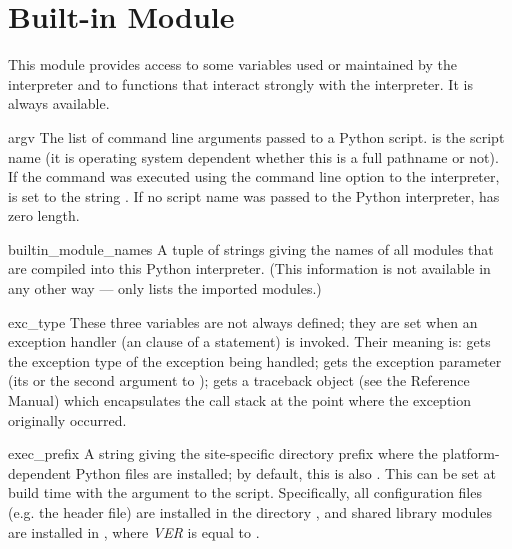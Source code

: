 \section{Built-in Module }

This module provides access to some variables used or maintained by the
interpreter and to functions that interact strongly with the interpreter.
It is always available.

\renewcommand{\indexsubitem}{(in module sys)}

\begin{datadesc}{argv}
  The list of command line arguments passed to a Python script.
   is the script name (it is operating system
  dependent whether this is a full pathname or not).
  If the command was executed using the  command line option
  to the interpreter,  is set to the string
  .
  If no script name was passed to the Python interpreter,
   has zero length.
\end{datadesc}

\begin{datadesc}{builtin_module_names}
  A tuple of strings giving the names of all modules that are compiled
  into this Python interpreter.  (This information is not available in
  any other way ---  only lists the imported
  modules.)
\end{datadesc}

\begin{datadesc}{exc_type}
  These three variables are not always defined; they are set when an
  exception handler (an  clause of a  statement) is
  invoked.  Their meaning is:  gets the exception type of
  the exception being handled;  gets the exception
  parameter (its  or the second argument to
  );  gets a traceback object (see the
  Reference Manual) which
  encapsulates the call stack at the point where the exception
  originally occurred.
\end{datadesc}

\begin{datadesc}{exec_prefix}
A string giving the site-specific
directory prefix where the platform-dependent Python files are
installed; by default, this is also .  This can be
set at build time with the  argument to the
 script.  Specifically, all configuration files
(e.g. the  header file) are installed in the directory
, and shared library
modules are installed in
,
where \emph{VER} is equal to .
\end{datadesc}

